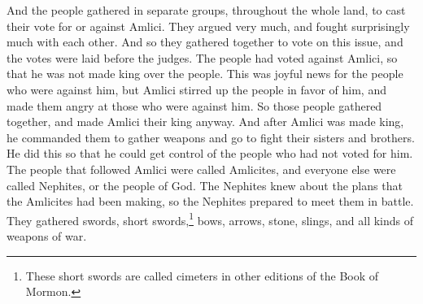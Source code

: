 And the people gathered in separate groups, throughout the whole land, to cast their vote for or against Amlici. They argued very much, and fought surprisingly much with each other.
\bverse \iffalse And thus they did assemble themselves together to cast in their voices concerning the matter; and they were laid before the judges. \fi
And so they gathered together to vote on this issue, and the votes were laid before the judges.
\bverse \iffalse And it came to pass that the voice of the people came against Amlici, that he was not made king over the people. \fi
The people had voted against Amlici, so that he was not made king over the people.
\bverse \iffalse Now this did cause much joy in the hearts of those who were against him; but Amlici did stir up those who were in his favor to anger against those who were not in his favor. \fi
This was joyful news for the people who were against him, but Amlici stirred up the people in favor of him, and made them angry at those who were against him.
\bverse \iffalse And it came to pass that they gathered themselves together, and did consecrate Amlici to be their king. \fi
So those people gathered together, and made Amlici their king anyway.
\bverse \iffalse Now when Amlici was made king over them he commanded them that they should take up arms against their brethren; and this he did that he might subject them to him. \fi
And after Amlici was made king, he commanded them to gather weapons and go to fight their sisters and brothers. He did this so that he could get control of the people who had not voted for him.
\bverse \iffalse Now the people of Amlici were distinguished by the name of Amlici, being called Amlicites; and the remainder were called Nephites, or the people of God. \fi
The people that followed Amlici were called Amlicites, and everyone else were called Nephites, or the people of God.
\bverse \iffalse Therefore the people of the Nephites were aware of the intent of the Amlicites, and therefore they did prepare to meet them; yea, they did arm themselves with swords, and with cimeters, and with bows, and with arrows, and with stones, and with slings, and with all manner of weapons of war, of every kind. \fi
The Nephites knew about the plans that the Amlicites had been making, so the Nephites prepared to meet them in battle. They gathered swords, short swords,\footnote{These short swords are called cimeters in other editions of the Book of Mormon.} bows, arrows, stone, slings, and all kinds of weapons of war.
\bverse \iffalse And thus they were prepared to meet the Amlicites at the time of their coming. And there were appointed captains, and higher captains, and chief captains, according to their numbers. \fi
